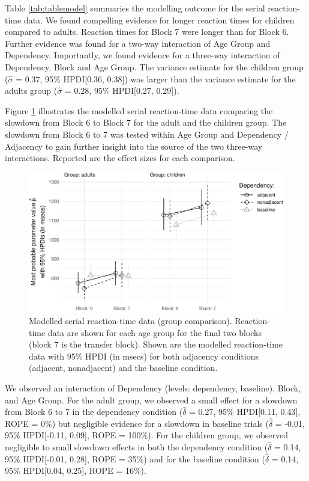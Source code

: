 \documentclass[
  english,
  man,floatsintext]{apa7}
\begin{document}
Table \ref{tab:tablemodel} summaries the modelling outcome for the serial reaction-time data. We found compelling evidence for longer reaction times for children compared to adults. Reaction times for Block 7 were longer than for Block 6. Further evidence was found for a two-way interaction of Age Group and Dependency. Importantly, we found evidence for a three-way interaction of Dependency, Block and Age Group. The variance estimate for the children group (\(\hat{\sigma}\) = 0.37, 95\% HPDI{[}0.36, 0.38{]}) was larger than the variance estimate for the adults group (\(\hat{\sigma}\) = 0.28, 95\% HPDI{[}0.27, 0.29{]}).

Figure \ref{fig:plotgroupcomp} illustrates the modelled serial reaction-time data comparing the slowdown from Block 6 to Block 7 for the adult and the children group. The slowdown from Block 6 to 7 was tested within Age Group and Dependency / Adjacency to gain further insight into the source of the two three-way interactions. Reported are the effect sizes for each comparison.

\begin{figure}[ht]

{\centering \includegraphics{Group-comparison_files/figure-latex/plotgroupcomp-1} 

}

\caption{Modelled serial reaction-time data (group comparison). Reaction-time data are shown for each age group for the final two blocks (block 7 is the transfer block). Shown are the modelled reaction-time data with 95\% HPDI (in msecs) for both adjacency conditions (adjacent, nonadjacent) and the baseline condition.}\label{fig:plotgroupcomp}
\end{figure}

We observed an interaction of Dependency (levels: dependency, baseline), Block, and Age Group. For the adult group, we observed a small effect for a slowdown from Block 6 to 7 in the dependency condition (\(\hat{\delta}\) = 0.27, 95\% HPDI{[}0.11, 0.43{]}, ROPE = 0\%) but negligible evidence for a slowdown in baseline trials (\(\hat{\delta}\) = -0.01, 95\% HPDI{[}-0.11, 0.09{]}, ROPE = 100\%). For the children group, we observed negligible to small slowdown effects in both the dependency condition (\(\hat{\delta}\) = 0.14, 95\% HPDI{[}-0.01, 0.28{]}, ROPE = 35\%) and for the baseline condition (\(\hat{\delta}\) = 0.14, 95\% HPDI{[}0.04, 0.25{]}, ROPE = 16\%).
\end{document}
